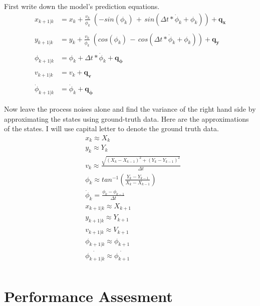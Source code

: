 \documentclass[peerreview]{IEEEtran}
\begin{document}
First write down the model's prediction equations.
\begin{equation}
\begin{aligned}
x_{k+1|k} &= x_k + \frac{v_k}{\dot{\phi}_k} \; (-sin(\phi_k) \, + \, sin(\Delta t * \dot{\phi}_k + \phi_k )) + \boldsymbol{q_x} \\ \\
y_{k+1|k} &= y_k + \frac{v_k}{\dot{\phi}_k} \; (cos(\phi_k) \, - \, cos(\Delta t * \dot{\phi}_k + \phi_k )) + \boldsymbol{q_y} \\ \\
\phi_{k+1|k} &= \phi_k + \Delta t * \dot{\phi}_k + \boldsymbol{q_{\phi}} \\ \\
v_{k+1|k} &= v_k + \boldsymbol{q_v} \\ \\
\dot{\phi}_{k+1|k} &= \dot{\phi}_k + \boldsymbol{q_{\dot{\phi}}} 
\end{aligned}
\end{equation}

Now leave the process noises alone and find the variance of the right hand side by approximating the states using ground-truth data. Here are the approximations of the states. I will use capital letter to denote the ground truth data.\\

\begin{equation}
\begin{aligned}
&x_k \approx X_k \\ 
&y_k \approx Y_k \\ 
&v_k \approx \frac{\sqrt{(X_k - X_{k-1})^2 + (Y_k - Y_{k-1})^2}}{\Delta t} \\  
&\phi_k \approx tan^{-1}( \frac{Y_{k} - Y_{k-1}}{X_{k} - X_{k-1}}) \\ 
&\dot{\phi}_k =  \frac{\phi_k - \phi_{k-1}}{\Delta t} \\
&x_{k+1|k} \approx X_{k+1} \\ 
&y_{k+1|k} \approx Y_{k+1} \\ 
&v_{k+1|k} \approx V_{k+1} \\
&\phi_{k+1|k} \approx \phi_{k+1} \\
&\dot{\phi_{k+1|k}} \approx \dot{\phi_{k+1}} \\
\end{aligned}
\end{equation}

\vspace{5px}
\section{Performance Assesment}
\vspace{5px}
\end{document}
